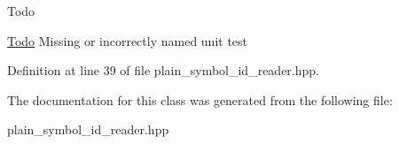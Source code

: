 \begin{DoxyRefDesc}{Todo}
\item[\hyperlink{todo__todo000036}{Todo}]Missing or incorrectly named unit test\end{DoxyRefDesc}


Definition at line 39 of file plain\-\_\-symbol\-\_\-id\-\_\-reader.\-hpp.



The documentation for this class was generated from the following file\-:\begin{DoxyCompactItemize}
\item 
plain\-\_\-symbol\-\_\-id\-\_\-reader.\-hpp\end{DoxyCompactItemize}
